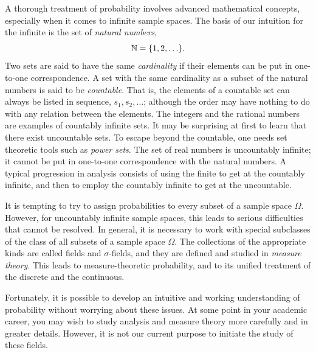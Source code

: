 A thorough treatment of probability involves advanced mathematical concepts, especially when it comes to infinite sample spaces.
The basis of our intuition for the infinite is the set of \emph{natural numbers},
\begin{equation*}
\mathbb{N} = \{ 1, 2, \ldots \}.
\end{equation*}
Two sets are said to have the same \emph{cardinality} if their elements can be put in one-to-one correspondence.
A set with the same cardinality as a subset of the natural numbers is said to be \emph{countable}.
That is, the elements of a countable set can always be listed in sequence, $s_1, s_2, \ldots$; although the order may have nothing to do with any relation between the elements.
The integers and the rational numbers are examples of countably infinite sets.
It may be surprising at first to learn that there exist uncountable sets.
To escape beyond the countable, one needs set theoretic tools such as \emph{power sets}.
The set of real numbers is uncountably infinite; it cannot be put in one-to-one correspondence with the natural numbers.
A typical progression in analysis consists of using the finite to get at the countably infinite, and then to employ the countably infinite to get at the uncountable.

It is tempting to try to assign probabilities to every subset of a sample space $\Omega$.
However, for uncountably infinite sample spaces, this leads to serious difficulties that cannot be resolved.
In general, it is necessary to work with special subclasses of the class of all subsets of a sample space $\Omega$.
The collections of the appropriate kinds are called fields and $\sigma$-fields, and they are defined and studied in \emph{measure theory}.
This leads to measure-theoretic probability, and to its unified treatment of the discrete and the continuous.

Fortunately, it is possible to develop an intuitive and working understanding of probability without worrying about these issues.
At some point in your academic career, you may wish to study analysis and measure theory more carefully and in greater details.
However, it is not our current purpose to initiate the study of these fields.

